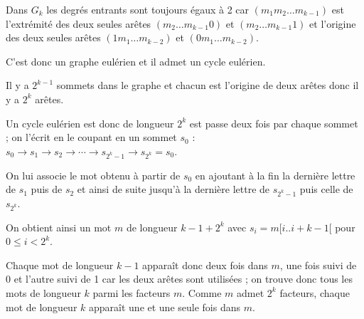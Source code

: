 \begin{Exercise}
Dans $G_k$ les degrés entrants sont toujours égaux à 2 car $(m_1m_2\ldots m_{k-1})$ est l'extrémité des deux seules arêtes $(m_2\ldots m_{k-1}0)$ et $(m_2\ldots m_{k-1}1)$ et l'origine des deux seules arêtes $(1m_1\ldots m_{k-2})$ et $(0m_1\ldots m_{k-2})$.

C'est donc un graphe eulérien et il admet un cycle eulérien.

Il y a $2^{k-1}$ sommets dans le graphe et chacun est l'origine de deux arêtes donc il y a $2^k$ arêtes.

Un cycle eulérien est donc de longueur $2^k$ est passe deux fois par chaque sommet ; on l'écrit en le coupant en un sommet $s_0$ :
$s_0 \rightarrow s_1 \rightarrow s_2 \rightarrow\cdots \rightarrow s_{2^k-1}\rightarrow s_{2^k} = s_0$.

On lui associe le mot obtenu à partir de $s_0$ en ajoutant à la fin la dernière lettre de $s_1$ puis de $s_2$ et ainsi de suite jusqu'à la dernière lettre de $s_{2^k-1}$ puis celle de $s_{2^k}$.

On obtient ainsi un mot $m$ de longueur $k-1+2^k$ avec $s_i = m[i..i+k-1[$ pour $0\le i < 2^k$.

Chaque mot de longueur $k-1$ apparaît donc deux fois dans $m$, une fois suivi de 0 et l'autre suivi de 1 car les deux arêtes sont utilisées ; on trouve donc tous les mots de longueur $k$ parmi les facteurs $m$. Comme $m$ admet $2^k$ facteurs, chaque mot de longueur $k$ apparaît une et une seule fois dans $m$.
\end{Exercise} 


